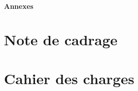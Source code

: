 \newpage
~\vspace{5cm}
\begin{center}
	{\Huge \textbf{Annexes}}
\end{center}
\newpage

\appendix

\section{Note de cadrage}
\label{note-cadrage}


\section{Cahier des charges}
\label{cahier-charges}


